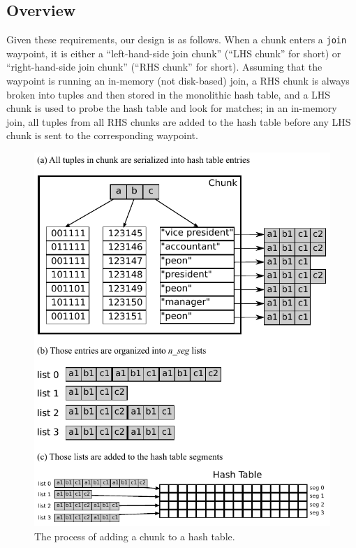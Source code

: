 \documentclass{sig-alternate}
\renewcommand\:{\colon} %
\begin{document}
\subsection{Overview}

Given these requirements, our design is as follows.
When a chunk enters a \texttt{join} waypoint, it is either a ``left-hand-side join chunk'' (``LHS chunk'' for short)
or ``right-hand-side join chunk'' (``RHS chunk'' for short).  Assuming that
the waypoint is running an in-memory (not disk-based) join, 
a RHS chunk is always broken into tuples and then stored in the monolithic hash table, and
a LHS chunk is used to probe the hash table and look for matches; in an in-memory join, all tuples from all RHS chunks are added to
the hash table before any LHS chunk is sent to the corresponding waypoint.

\begin{figure}
\includegraphics[scale=0.75]{Serialization.pdf}
\caption{The process of adding a chunk to a hash table.} \label{serialization}
\end{figure}
\end{document}
